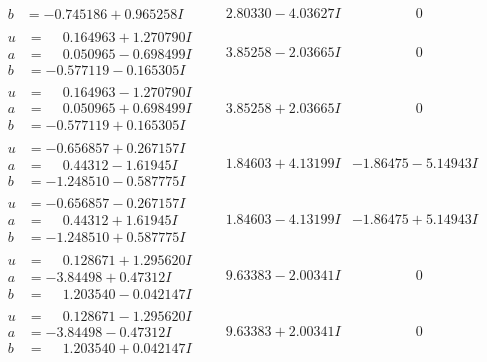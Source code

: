 \documentclass[1p]{elsarticle_modified}
\theoremstyle{definition}
\begin{document}
$$\begin{array}{c|c|c}
\begin{aligned}
b &= -0.745186 + 0.965258 I\end{aligned}
 & \phantom{-}2.80330 - 4.03627 I & \phantom{-0.000000 } 0 \\ \hline\begin{aligned}
u &= \phantom{-}0.164963 + 1.270790 I \\
a &= \phantom{-}0.050965 - 0.698499 I \\
b &= -0.577119 - 0.165305 I\end{aligned}
 & \phantom{-}3.85258 - 2.03665 I & \phantom{-0.000000 } 0 \\ \hline\begin{aligned}
u &= \phantom{-}0.164963 - 1.270790 I \\
a &= \phantom{-}0.050965 + 0.698499 I \\
b &= -0.577119 + 0.165305 I\end{aligned}
 & \phantom{-}3.85258 + 2.03665 I & \phantom{-0.000000 } 0 \\ \hline\begin{aligned}
u &= -0.656857 + 0.267157 I \\
a &= \phantom{-}0.44312 - 1.61945 I \\
b &= -1.248510 - 0.587775 I\end{aligned}
 & \phantom{-}1.84603 + 4.13199 I & -1.86475 - 5.14943 I \\ \hline\begin{aligned}
u &= -0.656857 - 0.267157 I \\
a &= \phantom{-}0.44312 + 1.61945 I \\
b &= -1.248510 + 0.587775 I\end{aligned}
 & \phantom{-}1.84603 - 4.13199 I & -1.86475 + 5.14943 I \\ \hline\begin{aligned}
u &= \phantom{-}0.128671 + 1.295620 I \\
a &= -3.84498 + 0.47312 I \\
b &= \phantom{-}1.203540 - 0.042147 I\end{aligned}
 & \phantom{-}9.63383 - 2.00341 I & \phantom{-0.000000 } 0 \\ \hline\begin{aligned}
u &= \phantom{-}0.128671 - 1.295620 I \\
a &= -3.84498 - 0.47312 I \\
b &= \phantom{-}1.203540 + 0.042147 I\end{aligned}
 & \phantom{-}9.63383 + 2.00341 I & \phantom{-0.000000 } 0 \\ \hline\begin{aligned}

\end{aligned}
\end{array}$$
\end{document}
